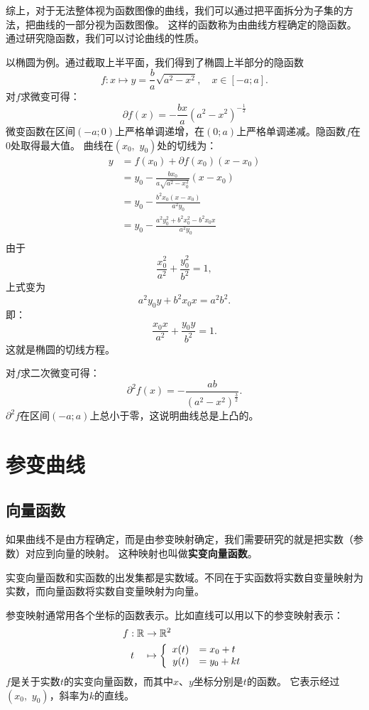\documentclass[12pt,UTF8]{ctexbook}
\theoremstyle{definition}
\theoremstyle{plain}
\begin{document}
综上，对于无法整体视为函数图像的曲线，我们可以通过把平面拆分为子集的方法，把曲线的一部分视为函数图像。
这样的函数称为由曲线方程确定的隐函数。通过研究隐函数，我们可以讨论曲线的性质。

以椭圆为例。通过截取上半平面，我们得到了椭圆上半部分的隐函数
$$ f: x\mapsto y = \frac{b}{a}\sqrt{a^2 - x^2}, \quad x \in [-a; a].  $$
对$f$求微变可得：
$$ \partial f(x) = -\frac{bx}{a}(a^2 - x^2)^{-\frac{1}{2}}$$
微变函数在区间$(-a;0)$上严格单调递增，在$(0;a)$上严格单调递减。隐函数$f$在$0$处取得最大值。
曲线在$(x_0,\,\, y_0)$处的切线为：
\begin{align*}
    y &= f(x_0) + \partial f(x_0)(x - x_0) \\
    &= y_0 -\frac{bx_0}{a\sqrt{a^2 - x_0^2}}(x - x_0) \\
    &= y_0 - \frac{b^2x_0(x - x_0)}{a^2y_0} \\
    &= y_0 - \frac{a^2y_0^2 + b^2x_0^2 - b^2x_0x}{a^2y_0} \\
\end{align*}
由于
$$ \frac{x_0^2}{a^2} + \frac{y_0^2}{b^2} = 1,$$
上式变为
$$ a^2y_0y +  b^2x_0x = a^2b^2. $$
即：
$$ \frac{x_0x}{a^2} + \frac{y_0y}{b^2} = 1.$$
这就是椭圆的切线方程。

对$f$求二次微变可得：
$$ \partial^2 f(x) = -\frac{ab}{(a^2 - x^2)^{\frac{3}{2}} }.$$
$\partial^2 f$在区间$(-a;a)$上总小于零，这说明曲线总是上凸的。

\chapter{参变曲线}

\section{向量函数}

如果曲线不是由方程确定，而是由参变映射确定，我们需要研究的就是把实数（参数）对应到向量的映射。
这种映射也叫做\textbf{实变向量函数}。

实变向量函数和实函数的出发集都是实数域。不同在于实函数将实数自变量映射为实数，而向量函数将实数自变量映射为向量。

参变映射通常用各个坐标的函数表示。比如直线可以用以下的参变映射表示：
\begin{align*}
    f: \mathbb{R} &\rightarrow \mathbb{R}^2 \\
    t\quad &\mapsto\left\{
        \begin{array}[]{rl}
            x(t) &= x_0 + t \\
            y(t) &= y_0 + kt \\
        \end{array}
    \right.
\end{align*}
$f$是关于实数$t$的实变向量函数，而其中$x$、$y$坐标分别是$t$的函数。
它表示经过$(x_0,\,\, y_0)$，斜率为$k$的直线。
\end{document}
